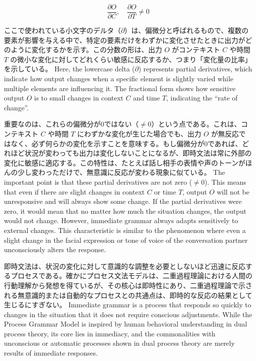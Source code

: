 \documentclass[a4paper,xelatex,ja=standard]{bxjsarticle}
\begin{document}
\[
\frac{\partial O}{\partial C}, \quad \frac{\partial O}{\partial T} \neq 0
\]

\ifJPN
ここで使われている小文字のデルタ（\( \partial \)）は、偏微分と呼ばれるもので、複数の要素が影響を与える中で、特定の要素だけをわずかに変化させたときに出力がどのように変化するかを示す。この分数の形は、出力 \( O \) がコンテキスト \( C \) や時間 \( T \) の微小な変化に対してどれくらい敏感に反応するか、つまり「変化量の比率」を示している。
\else
Here, the lowercase delta (\( \partial \)) represents partial derivatives, which indicate how output changes when a specific element is slightly varied while multiple elements are influencing it. The fractional form shows how sensitive output \( O \) is to small changes in context \( C \) and time \( T \), indicating the ``rate of change''.
\fi

\ifJPN
重要なのは、これらの偏微分が0ではない（\( \neq 0 \)）という点である。これは、コンテキスト \( C \) や時間 \( T \) にわずかな変化が生じた場合でも、出力 \( O \) が無反応ではなく、必ず何らかの変化を示すことを意味する。もし偏微分が0であれば、どれほど状況が変わっても出力は変化しないことになるが、即時文法は常に外部の変化に敏感に適応する。この特性は、たとえば話し相手の表情や声のトーンがほんの少し変わっただけで、無意識に反応が変わる現象に似ている。
\else
The important point is that these partial derivatives are not zero (\( \neq 0 \)). This means that even if there are slight changes in context \( C \) or time \( T \), output \( O \) will not be unresponsive and will always show some change. If the partial derivatives were zero, it would mean that no matter how much the situation changes, the output would not change. However, immediate grammar always adapts sensitively to external changes. This characteristic is similar to the phenomenon where even a slight change in the facial expression or tone of voice of the conversation partner unconsciously alters the response.
\fi

\ifJPN
即時文法は、状況の変化に対して意識的な調整を必要としないほど迅速に反応するプロセスである。確かにプロセス文法モデルは、二重過程理論における人間の行動理解から発想を得ているが、その核心は即時性にあり、二重過程理論で示される無意識的または自動的なプロセスとの共通点は、即時的な反応の結果として生じるにすぎない。
\else
Immediate grammar is a process that responds so quickly to changes in the situation that it does not require conscious adjustments. While the Process Grammar Model is inspired by human behavioral understanding in dual process theory, its core lies in immediacy, and the commonalities with unconscious or automatic processes shown in dual process theory are merely results of immediate responses.
\fi
\end{document}
